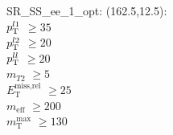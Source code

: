SR\_SS\_ee\_1\_opt: (162.5,12.5): \\
$p_{\text{T}}^{l1}$ $\geq 35$ \\
$p_{\text{T}}^{l2}$ $\geq 20$ \\
$p_{\text{T}}^{ll}$ $\geq 20$ \\
$m_{T2}$ $\geq 5$ \\
$E_{\text{T}}^{\text{miss,rel}}$ $\geq 25$ \\
$m_{\text{eff}}$ $\geq 200$ \\
$m_{\text{T}}^{\text{max}}$ $\geq 130$ \\
